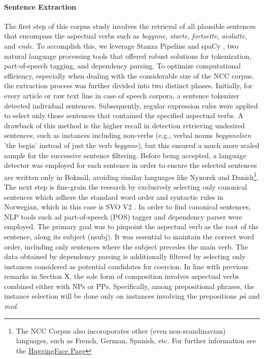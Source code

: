 \documentclass{article}
\begin{document}
\paragraph{Sentence Extraction}
The first step of this corpus study involves the retrieval of all plausible sentences that encompass the aspectual verbs such as \textit{begynne}, \textit{starte}, \textit{fortsette}, \textit{avslutte}, and \textit{ende}. 
To accomplish this, we leverage Stanza Pipeline \parencite{qi_stanza_2020} and spaCy \parencite{honnibal_spacy_2017}, two natural language processing tools that offered robust solutions for tokenization, part-of-speech tagging, and dependency parsing. To optimize computational efficiency, especially when dealing with the considerable size of the NCC corpus, the extraction process was further divided into two distinct phases. Initially, for every article or raw text line in  case of speech corpora, a sentence tokenizer detected individual sentences. Subsequently, regular expression rules were applied to select only those sentences that contained the specified aspectual verbs. 
A drawback of this method is the higher recall in detection retrieving undesired sentences, such as instances including non-verbs (e.g., verbal nouns \textit{begynnelsen} 'the begin' instead of just the verb \textit{begynne}), but this ensured a much more scaled sample for the successive sentence filtering. Before being accepted, a language detector was employed for each sentence in order to ensure the selected sentences are written only in Bokmål, avoiding similar languages like Nynorsk and Danish\footnote{The NCC Corpus also incoroporates other (even non-scandinavian) languages, such as French, German, Spanish, etc. For further information see the \href{https://huggingface.co/datasets/NbAiLab/NCC}{HuggingFace Page}}.\\
The next step is fine-grain the research by exclusively selecting only canonical sentences which adhere the standard word order and syntactic rules in Norwegian, which in this case is SVO V2 \parencite[pp. 858-862]{faarlund_norsk_1997}. In order to find canonical sentences, NLP tools such ad part-of-speech (POS) tagger and dependency parser were employed. The primary goal was to pinpoint the aspectual verb as the root of the sentence, along its subject (nsubj). It was essential to maintain the correct word order, including only sentences where the subject precedes the main verb. The data obtained by dependency parsing is additionally filtered by selecting only instances considered as potential candidates for coercion. In line with previous remarks in Section X, the sole form of composition involves aspectual verbs combined either with NPs or PPs. Specifically, among prepositional phrases, the instance selection  will be done only on instances involving the prepositions \emph{på} and \emph{med}. 
\end{document}
